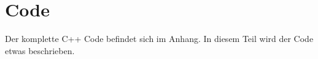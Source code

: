 \section{Code}
Der komplette C++ Code befindet sich im Anhang. In diesem Teil wird der Code etwas beschrieben.